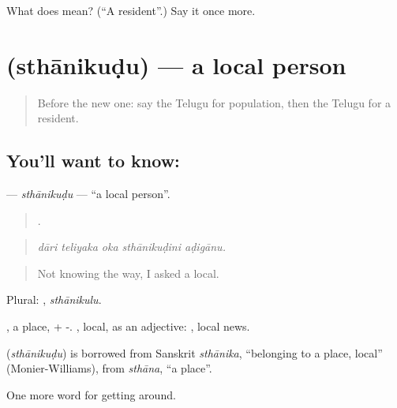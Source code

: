 \begin{tcolorbox}[breakable,colback=teal!4,colframe=teal!35!black,title={Before you move on}]
What does  mean? (\textquotedblleft{}A resident\textquotedblright{}.) Say it once more.
\end{tcolorbox}
\section[\texorpdfstring{\te{స్థానికుడు} (sthānikuḍu)}{స్థానికుడు (sthānikuḍu)}]{ (sthānikuḍu) — a local person}

\label{lesson:TE-C465-sthanikudu}



\begin{quote}
Before the new one: say the Telugu for population, then the Telugu for a resident.
\end{quote}

\subsection*{You'll want to know: }
\textbf{} — \emph{sthānikuḍu} — \textquotedblleft{}a local person\textquotedblright{}.

\begin{quote}
    .
\end{quote}

\begin{quote}
\emph{dāri teliyaka oka sthānikuḍini aḍigānu.}
\end{quote}

\begin{quote}
Not knowing the way, I asked a local.
\end{quote}

Plural: , \emph{sthānikulu}.

, a place, + -. , local, as an adjective:  , local news.

\begin{cousinweb}
\textbf{} (\emph{sthānikuḍu}) is borrowed from Sanskrit \emph{sthānika}, \textquotedblleft{}belonging to a place, local\textquotedblright{} (Monier-Williams), from \emph{sthāna}, \textquotedblleft{}a place\textquotedblright{}.
\end{cousinweb}

\begin{grammarlens}[title={What you've built}]
One more word for getting around.
\end{grammarlens}

